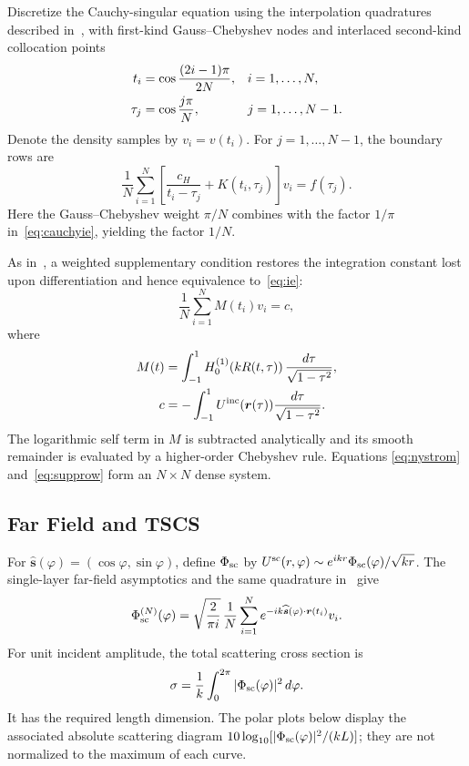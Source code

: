 \documentclass[conference]{IEEEtran}
\begin{document}
Discretize the Cauchy-singular equation using the interpolation quadratures
described in~\cite{nosich2005,nosich2007,nosich_josa2007}, with first-kind
Gauss--Chebyshev nodes and interlaced second-kind collocation points
\begin{align}
 t_i&=\cos\frac{(2i-1)\pi}{2N},&&i=1,\ldots,N, \notag\\
 \tau_j&=\cos\frac{j\pi}{N},&&j=1,\ldots,N-1.                    \label{eq:nodes}
\end{align}
Denote the density samples by $v_i=v(t_i)$.
For $j=1,\ldots,N-1$, the boundary rows are
\begin{equation}
 \frac{1}{N}\sum_{i=1}^{N}
 \left[\frac{c_H}{t_i-\tau_j}+K(t_i,\tau_j)\right]v_i=f(\tau_j).
 \label{eq:nystrom}
\end{equation}
Here the Gauss--Chebyshev weight $\pi/N$ combines with the factor $1/\pi$
in~\eqref{eq:cauchyie}, yielding the factor $1/N$.

As in~\cite{nosich2005,nosich2007}, a weighted supplementary condition restores
the integration constant lost upon differentiation and hence equivalence
to~\eqref{eq:ie}:
\begin{equation}
 \frac{1}{N}\sum_{i=1}^{N}M(t_i)v_i=c,                                  \label{eq:supprow}
\end{equation}
where
\begin{align}
 M(t)&=\int_{-1}^{1}H_0^{(1)}\!\left(kR(t,\tau)\right)
          \frac{d\tau}{\sqrt{1-\tau^2}},                                \label{eq:mdef}\\
 c&=-\int_{-1}^{1}U^{\rm inc}(\boldsymbol r(\tau))
          \frac{d\tau}{\sqrt{1-\tau^2}}.                               \label{eq:cdef}
\end{align}
The logarithmic self term in $M$ is subtracted analytically and its smooth
remainder is evaluated by a higher-order Chebyshev rule.  Equations
\eqref{eq:nystrom} and~\eqref{eq:supprow} form an $N\times N$ dense system.

\subsection{Far Field and TSCS}

For $\widehat{\boldsymbol s}(\varphi)=(\cos\varphi,\sin\varphi)$, define
$\Phi_{\rm sc}$ by
$U^{\rm sc}(r,\varphi)\sim e^{ikr}\Phi_{\rm sc}(\varphi)/\sqrt{kr}$.
The single-layer far-field asymptotics and the same quadrature
in~\cite{nosich2007} give
\begin{equation}
 \Phi_{\rm sc}^{(N)}(\varphi)
 =\sqrt{\frac{2}{\pi i}}\,\frac{1}{N}\sum_{i=1}^{N}
 e^{-ik\widehat{\boldsymbol s}(\varphi)\cdot\boldsymbol r(t_i)}v_i.
 \label{eq:farfield}
\end{equation}
For unit incident amplitude, the total scattering cross section is
\begin{equation}
 \sigma=\frac{1}{k}\int_{0}^{2\pi}|\Phi_{\rm sc}(\varphi)|^2\,d\varphi.
 \label{eq:tscs}
\end{equation}
It has the required length dimension.  The polar plots below display the
associated absolute scattering diagram
 $10\log_{10}[|\Phi_{\rm sc}(\varphi)|^2/(kL)]$; they are not normalized to the
 maximum of each curve.
\end{document}
